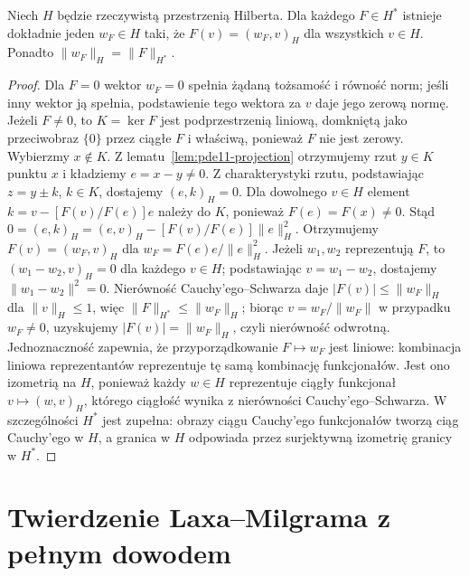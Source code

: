 \begin{twierdzenie}
\label{thm:pde11-riesz}
Niech $H$ będzie rzeczywistą przestrzenią Hilberta.
Dla każdego $F\in H^*$ istnieje dokładnie jeden $w_F\in H$ taki, że
$F(v)=(w_F,v)_H$ dla wszystkich $v\in H$.
Ponadto $\|w_F\|_H=\|F\|_{H^*}$.
\end{twierdzenie}
\begin{proof}
Dla $F=0$ wektor $w_F=0$ spełnia żądaną tożsamość
i równość norm; jeśli inny wektor ją spełnia, podstawienie
tego wektora za $v$ daje jego zerową normę.
Jeżeli $F\ne0$, to $K=\ker F$ jest podprzestrzenią
liniową, domkniętą jako przeciwobraz $\{0\}$ przez
ciągłe $F$ i właściwą, ponieważ $F$ nie jest zerowy. Wybierzmy $x\notin K$.
Z lematu~\ref{lem:pde11-projection} otrzymujemy rzut
$y\in K$ punktu $x$ i kładziemy $e=x-y\ne0$.
Z charakterystyki rzutu, podstawiając $z=y\pm k$,
$k\in K$, dostajemy $(e,k)_H=0$.
Dla dowolnego $v\in H$ element
$k=v-[F(v)/F(e)]e$ należy do $K$, ponieważ
$F(e)=F(x)\ne0$. Stąd
$0=(e,k)_H=(e,v)_H-[F(v)/F(e)]\|e\|_H^2$.
Otrzymujemy $F(v)=(w_F,v)_H$ dla
$w_F=F(e)e/\|e\|_H^2$.
Jeżeli $w_1,w_2$ reprezentują $F$, to
$(w_1-w_2,v)_H=0$ dla każdego $v\in H$; podstawiając
$v=w_1-w_2$, dostajemy $\|w_1-w_2\|^2=0$.
Nierówność Cauchy'ego--Schwarza daje
$|F(v)|\le\|w_F\|_H$ dla $\|v\|_H\le1$, więc
$\|F\|_{H^*}\le\|w_F\|_H$; biorąc
$v=w_F/\|w_F\|$ w przypadku $w_F\ne0$,
uzyskujemy $|F(v)|=\|w_F\|_H$, czyli nierówność odwrotną.
Jednoznaczność zapewnia, że przyporządkowanie
$F\mapsto w_F$ jest liniowe: kombinacja liniowa
reprezentantów reprezentuje tę samą kombinację funkcjonałów.
Jest ono izometrią na $H$, ponieważ każdy $w\in H$
reprezentuje ciągły funkcjonał $v\mapsto(w,v)_H$,
którego ciągłość wynika z nierówności
Cauchy'ego--Schwarza. W szczególności $H^*$ jest
zupełna: obrazy ciągu Cauchy'ego funkcjonałów tworzą
ciąg Cauchy'ego w $H$, a granica w $H$ odpowiada
przez surjektywną izometrię granicy w $H^*$.
\end{proof}

\section{Twierdzenie Laxa--Milgrama z pełnym dowodem}
\label{sec:pde11-lax}

